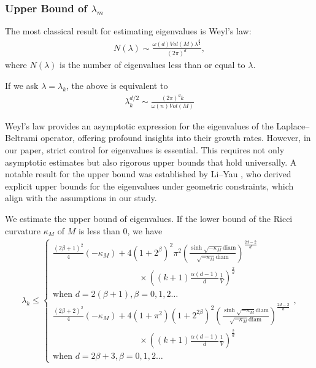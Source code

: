 \subsubsection{Upper Bound of \texorpdfstring{$\lambda_m$}{lambda\_m}}
\label{sec:phim-lambdam}


The most classical result for estimating eigenvalues is Weyl's law:
\begin{align}
N(\lambda)\sim \frac{\omega(d) Vol(M) \lambda^\frac{d}{2}}{(2\pi)^{d}},
\end{align}
where $N(\lambda)$ is the number of eigenvalues less than or equal to $\lambda$. 

If we ask $\lambda=\lambda_k$, the above is equivalent to
\begin{align}
	\lambda_k^{d/2} \sim \frac{(2\pi)^d k}{\omega(n) Vol(M)}
\end{align}

Weyl's law provides an asymptotic expression for the eigenvalues of the Laplace--Beltrami operator, offering profound insights into their growth rates. However, in our paper, strict control for eigenvalues is essential. This requires not only asymptotic estimates but also rigorous upper bounds that hold universally. A notable result for the upper bound was established by Li--Yau \cite[Thm. 16]{esteigenvalue}, who derived explicit upper bounds for the eigenvalues under geometric constraints, which align with the assumptions in our study.


We estimate the upper bound of eigenvalues. If the lower bound of the Ricci curvature $\kappa_M$ of $M$ is less than $0$, we have 
\begin{align}
	\lambda_k \leq 
	\left\{
	\begin{array}{l}
		\displaystyle \frac{(2\beta+1)^2}{4}(-\kappa_M) + 4(1+2^\beta)^2\pi^2 \left(\frac{\sinh \sqrt{-\kappa_M}\text{diam}}{\sqrt{-\kappa_M}\text{diam}}\right)^\frac{2d-2}{d} \\
		\hspace{10em} \times \left((k+1)\frac{\alpha(d-1)}{d}\frac{1}{V}\right)^\frac{2}{d} \\[1.5ex]
		\text{when } d=2(\beta+1), \beta = 0,1,2\dots \\[2.5ex]
		\displaystyle \frac{(2\beta+2)^2}{4}(-\kappa_M) + 4(1+\pi^2)(1+2^{2\beta})^2 \left(\frac{\sinh \sqrt{-\kappa_M}\text{diam}}{\sqrt{-\kappa_M}\text{diam}}\right)^\frac{2d-2}{d} \\
		\hspace{10em} \times \left((k+1)\frac{\alpha(d-1)}{d}\frac{1}{V}\right)^\frac{2}{d} \\[1.5ex]
		\text{when } d=2\beta+3, \beta = 0,1,2\dots
	\end{array} 
	\right. ,
\end{align}


